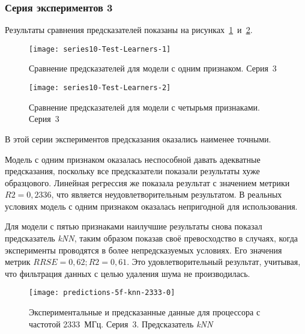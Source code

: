 \subsubsection{Серия экспериментов 3}

Результаты сравнения предсказателей показаны на рисунках~\ref{img:series10-Test-Learners-1}~и~\ref{img:series10-Test-Learners-2}.

\begin{figure}[tbp]
    \begin{center}
        \texttt{[image: series10-Test-Learners-1]}
        \caption{Сравнение предсказателей для модели с одним признаком. Серия~3} %
        \label{img:series10-Test-Learners-1} %
    \end{center}
\end{figure}

\begin{figure}[tbp]
    \begin{center}
        \texttt{[image: series10-Test-Learners-2]}
        \caption{Сравнение предсказателей для модели с четырьмя признаками. Серия~3}
        \label{img:series10-Test-Learners-2}
    \end{center}
\end{figure}

В этой серии экспериментов предсказания оказались наименее точными.

Модель с одним признаком оказалась неспособной давать адекватные предсказания, поскольку все предсказатели показали результаты хуже образцового. Линейная регрессия же показала результат с значением метрики $R2 = 0,2336$, что является неудовлетворительным результатом. В реальных условиях модель с одним признаком оказалась непригодной для использования.

Для модели с пятью признаками наилучшие результаты снова показал предсказатель \textit{kNN}, таким образом показав своё превосходство в случаях, когда эксперименты проводятся в более непредсказуемых условиях. Его значения метрик $RRSE = 0,62; R2 = 0,61$. Это удовлетворительный результат, учитывая, что фильтрация данных с целью удаления шума не производилась.

\begin{figure}[tbp]
    \begin{center}
        \texttt{[image: predictions-5f-knn-2333-0]}
        \caption{Экспериментальные и предсказанные данные для процессора с частотой 2333~МГц. Серия~3. Предсказатель \textit{kNN}}
        \label{img:predictions-5f-knn-2333-0}
    \end{center}
\end{figure}

